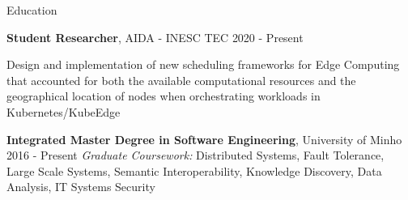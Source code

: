 \documentclass{resume}
\begin{document}

\begin{rSection}{Education}

\begin{rSubsection}
{\textbf{Student Researcher}, AIDA - INESC TEC \href{https://www.inesctec.pt/en/projects/aida}{\faLink}}{2020 - Present}{}{}

Design and implementation of new scheduling frameworks for Edge Computing that accounted for both the available computational resources and the geographical location of nodes when orchestrating workloads in Kubernetes/KubeEdge

\end{rSubsection}

\begin{rSubsection}
{\textbf{Integrated Master Degree in Software Engineering}, University of Minho \href{https://www.uminho.pt/EN}{\faLink}}{2016 - Present}{}{}
\textit{Graduate Coursework:} Distributed Systems, Fault Tolerance, Large Scale Systems, Semantic Interoperability, Knowledge Discovery, Data Analysis, IT Systems Security
\end{rSubsection}

\end{rSection}

\end{document}
